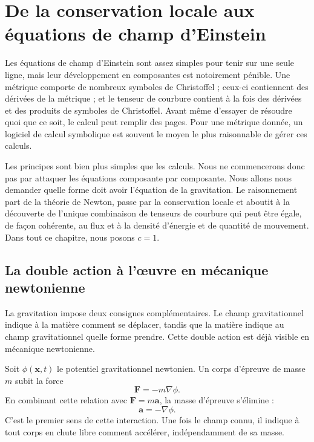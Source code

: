 \chapter{De la conservation locale aux équations de champ d’Einstein}

Les équations de champ d’Einstein sont assez simples pour tenir sur une seule ligne, mais leur développement en composantes est notoirement pénible. Une métrique comporte de nombreux symboles de Christoffel ; ceux-ci contiennent des dérivées de la métrique ; et le tenseur de courbure contient à la fois des dérivées et des produits de symboles de Christoffel. Avant même d’essayer de résoudre quoi que ce soit, le calcul peut remplir des pages. Pour une métrique donnée, un logiciel de calcul symbolique est souvent le moyen le plus raisonnable de gérer ces calculs.

Les principes sont bien plus simples que les calculs. Nous ne commencerons donc pas par attaquer les équations composante par composante. Nous allons nous demander quelle forme doit avoir l’équation de la gravitation. Le raisonnement part de la théorie de Newton, passe par la conservation locale et aboutit à la découverte de l’unique combinaison de tenseurs de courbure qui peut être égale, de façon cohérente, au flux et à la densité d’énergie et de quantité de mouvement. Dans tout ce chapitre, nous posons \(c=1\).

\section{La double action à l’œuvre en mécanique newtonienne}

La gravitation impose deux consignes complémentaires. Le champ gravitationnel indique à la matière comment se déplacer, tandis que la matière indique au champ gravitationnel quelle forme prendre. Cette double action est déjà visible en mécanique newtonienne.

Soit \(\phi(\mathbf{x},t)\) le potentiel gravitationnel newtonien. Un corps d’épreuve de masse \(m\) subit la force
\begin{equation}
 \mathbf{F}=-m\nabla\phi.
\end{equation}
En combinant cette relation avec \(\mathbf{F}=m\mathbf{a}\), la masse d’épreuve s’élimine :
\begin{equation}
 \mathbf{a}=-\nabla\phi.
\end{equation}
C’est le premier sens de cette interaction. Une fois le champ connu, il indique à tout corps en chute libre comment accélérer, indépendamment de sa masse.

